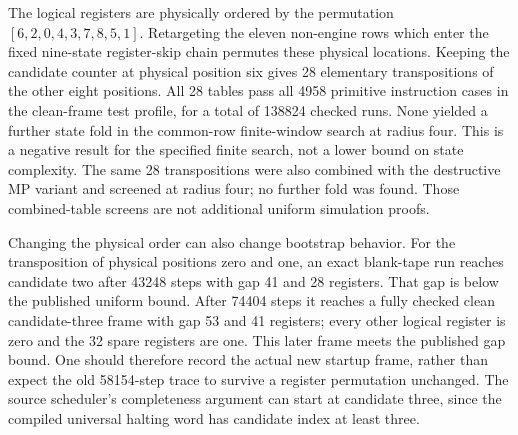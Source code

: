 The logical registers are physically ordered by the permutation
$[6,2,0,4,3,7,8,5,1]$. Retargeting the eleven non-engine rows which enter
the fixed nine-state register-skip chain permutes these physical
locations. Keeping the candidate counter at physical position six gives
28 elementary transpositions of the other eight positions. All 28
tables pass all 4958 primitive instruction cases in the clean-frame
test profile, for a total of 138824 checked runs. None yielded a further
state fold in the common-row finite-window search at radius four.
This is a negative result for the specified finite search, not a
lower bound on state complexity.
The same 28 transpositions were also combined with the destructive
MP variant and screened at radius four; no further fold was found.
Those combined-table screens are not additional uniform simulation
proofs.

Changing the physical order can also change bootstrap behavior.
For the transposition of physical positions zero and one, an exact
blank-tape run reaches candidate two after 43248 steps with gap 41
and 28 registers. That gap is below the published uniform bound.
After 74404 steps it reaches a fully checked clean candidate-three
frame with gap 53 and 41 registers; every other logical register is
zero and the 32 spare registers are one. This later frame meets the
published gap bound. One should therefore record the actual new
startup frame, rather than expect the old 58154-step trace to survive
a register permutation unchanged. The source scheduler's completeness
argument can start at candidate three, since the compiled universal
halting word has candidate index at least three.
